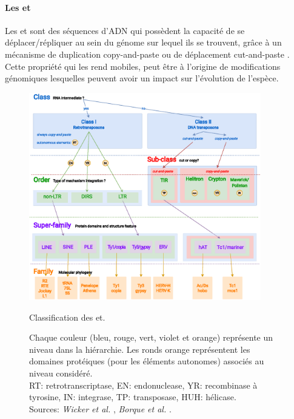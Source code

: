 \documentclass[10pt]{article}
\begin{document}
\bigskip

\paragraph{Les \acrlong{et}}\label{par:explanation_te} Les \acrlong{et} sont des séquences d'ADN qui possèdent la capacité de se déplacer/répliquer au sein du génome sur lequel ils se trouvent, grâce à un mécanisme de duplication \og copy-and-paste \fg{} \cite{bourque_ten_2018} ou de déplacement \og cut-and-paste \fg{}. Cette propriété qui les rend mobiles, peut être à l'origine de modifications génomiques lesquelles peuvent avoir un impact sur  l'évolution de l'espèce. \\

\bigskip

\begin{figure}[h]
    \centering
    \includegraphics[width=0.9\textwidth]{img/misc/transposable_elements.eps}
    \caption{Classification des \acrfull{et}.}
    \caption*{\scriptsize
    Chaque couleur (bleu, rouge, vert, violet et orange) représente un niveau dans la hiérarchie. Les ronds orange représentent les domaines protéiques (pour les éléments autonomes) associés au niveau considéré. \\
    RT: retrotranscriptase, EN: endonuclease, YR: recombinase à tyrosine, IN: integrase, TP: transposase, HUH: hélicase. \\
    Sources: \textit{Wicker et al.} \cite{wicker}, \textit{Borque et al.} \cite{bourque_ten_2018}.
    }
    
    \label{fig:classif_et}
\end{figure}
\end{document}
